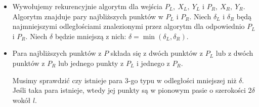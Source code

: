 \begin{obowiazkowy}
\begin{itemize}
\begin{itemize}
\begin{center}
			            \label{fig:closestpoints:split}
		            \end{center}

		      \item[\uemph{Zwyciężaj:}] Wywołujemy rekurencyjnie algorytm dla wejścia $P_L,\ X_L,\ Y_L$ i $P_R,\ X_R,\ Y_R$.
		            Algorytm znajduje pary najbliższych punktów w $P_L$ i $P_R$. Niech $\delta_L$ i $\delta_R$ będą
		            najmniejszymi odległościami znalezionymi przez algorytm dla odpowiednio $P_L$ i $P_R$.
		            Niech $\delta$ będzie mniejszą z nich: $\delta = \min(\delta_L,\delta_R)$.

		      \item[\uemph{Połącz:}] Para najbliższych punktów z $P$ składa się z dwóch punktów z $P_L$ lub z dwóch punktów
		            z $P_R$ lub jednego punkty z $P_L$ i jednego z $P_R$.

		            Musimy sprawdzić czy istnieje para 3-go typu w odległości mniejszej niż $\delta$.
		            Jeśli taka para istnieje, wtedy jej punkty są w pionowym pasie o szerokości $2\delta$
		            wokół $l$.


\end{itemize}
\end{itemize}
\end{obowiazkowy}
